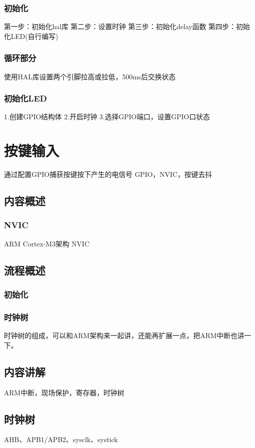 \documentclass[UTF8]{ctexart}
\begin{document}
\subsubsection{初始化}
第一步：初始化hal库
第二步：设置时钟
第三步：初始化delay函数
第四步：初始化LED(自行编写)
\subsubsection{循环部分}
使用HAL库设置两个引脚拉高或拉低，500ms后交换状态
\subsubsection{初始化LED}
1.创建GPIO结构体
2.开启时钟
3.选择GPIO端口，设置GPIO口状态


\newpage
\section{按键输入}
通过配置GPIO捕获按键按下产生的电信号
GPIO，NVIC，按键去抖
\subsection{内容概述}
\subsubsection{NVIC}
ARM Cortex-M3架构 NVIC
\subsection{流程概述}
\subsubsection{初始化}



\subsubsection{时钟树}
时钟树的组成，可以和ARM架构来一起讲，还能再扩展一点，把ARM中断也讲一下。
\subsection{内容讲解}
ARM中断，现场保护，寄存器，时钟树
\subsection{时钟树}
AHB、APB1/APB2、sysclk、systick
\end{document}

